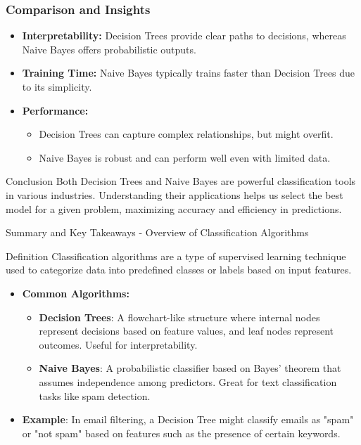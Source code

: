 \documentclass[aspectratio=169]{beamer}
\begin{document}
\begin{frame}[fragile]
    \frametitle{Comparison and Insights}
    \begin{itemize}
        \item \textbf{Interpretability:} Decision Trees provide clear paths to decisions, whereas Naive Bayes offers probabilistic outputs.
        \item \textbf{Training Time:} Naive Bayes typically trains faster than Decision Trees due to its simplicity.
        \item \textbf{Performance:} 
        \begin{itemize}
            \item Decision Trees can capture complex relationships, but might overfit.
            \item Naive Bayes is robust and can perform well even with limited data.
        \end{itemize}
    \end{itemize}
    
    \begin{block}{Conclusion}
        Both Decision Trees and Naive Bayes are powerful classification tools in various industries. Understanding their applications helps us select the best model for a given problem, maximizing accuracy and efficiency in predictions.
    \end{block}
\end{frame}

\begin{frame}[fragile]{Summary and Key Takeaways - Overview of Classification Algorithms}
    \begin{block}{Definition}
        Classification algorithms are a type of supervised learning technique used to categorize data into predefined classes or labels based on input features.
    \end{block}
    \begin{itemize}
        \item \textbf{Common Algorithms:}
        \begin{itemize}
            \item \textbf{Decision Trees}: A flowchart-like structure where internal nodes represent decisions based on feature values, and leaf nodes represent outcomes. Useful for interpretability.
            \item \textbf{Naive Bayes}: A probabilistic classifier based on Bayes' theorem that assumes independence among predictors. Great for text classification tasks like spam detection.
        \end{itemize}
        \item \textbf{Example}: In email filtering, a Decision Tree might classify emails as "spam" or "not spam" based on features such as the presence of certain keywords.
    \end{itemize}
\end{frame}
\end{document}
